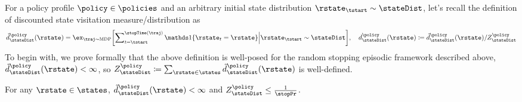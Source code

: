 For a policy profile $\policy \in \policies$ and an arbitrary initial state distribution $\rstate_\tstart\sim\stateDist$, let's recall the definition of  discounted state visitation measure/distribution as
\begin{equation*}
		\visitMeas{\stateDist}{\policy}\parens{\rstate} =\ex_{\traj \sim \MDP}\bracks*{\insum_{\time =\tstart}^{\stopTime\parens{\traj}}\one\braces{\rstate_{\time}=\rstate} \Big| \rstate_\tstart \sim \stateDist},\quad	\visitDistr{\stateDist}{\policy}\parens{\rstate} \defeq \visitMeas{\stateDist}{\policy}\parens{\rstate}/\normConst{\stateDist}{\policy}
\end{equation*}
To begin with, we prove formally that the above definition is well-posed for the random stopping episodic framework described above, \ie
$\visitMeas{\stateDist}{\policy}\parens{\rstate}<\infty$,
so 
$\normConst{\stateDist}{\policy}\defeq\sum_{\rstate\in\states }\visitMeas{\stateDist}{\policy}\parens{\rstate}$
is well-defined.


\begin{lemma}\label{lem:well-defined-visitation-distribution}
For any $\rstate \in \states$, $\visitMeas{\stateDist}{\policy}\parens{\rstate} < \infty$ and $\normConst{\stateDist}{\policy}\leq \tfrac{1}{\stopPr}$.
\end{lemma}


